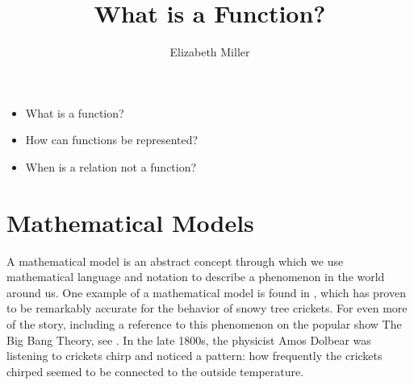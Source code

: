 \documentclass{ximera}
\author{Elizabeth Miller}
\title{What is a Function?}
\begin{document}
\begin{abstract}
  
\end{abstract}
\licenseORCCA
\maketitle



\begin{motivatingQuestions}\begin{itemize}
\item What is a function?
\item How can functions be represented?
\item When is a relation not a function?
\end{itemize}\end{motivatingQuestions}



\section{Mathematical Models}
A mathematical model is an abstract concept through which we use mathematical language and notation to describe a phenomenon in the world around us.  One example of a mathematical model is found in , which has proven to be remarkably accurate for the behavior of snowy tree crickets.  For even more of the story, including a reference to this phenomenon on the popular show The Big Bang Theory, see .  In the late 1800s, the physicist Amos Dolbear was listening to crickets chirp and noticed a pattern: how frequently the crickets chirped seemed to be connected to the outside temperature.  
\end{document}
